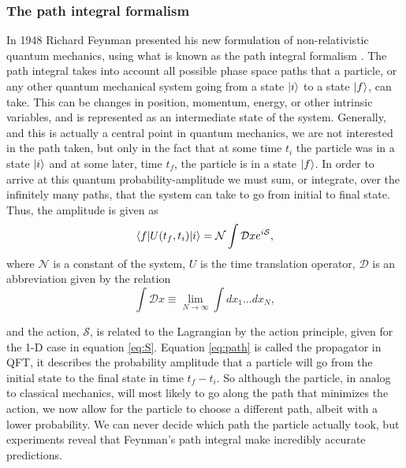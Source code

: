 \subsubsection{The path integral formalism} \label{sec:feynpath}
In 1948 Richard Feynman presented his new formulation of non-relativistic quantum mechanics, using what is known as the path integral formalism \cite{feynman1948sta}. The path integral takes into account all possible phase space paths that a particle, or any other quantum mechanical system going from a state $|i \rangle$ to a state $|f \rangle$, can take. This can be changes in position, momentum, energy, or other intrinsic variables, and is represented as an intermediate state of the system. Generally, and this is actually a central point in quantum mechanics, we are not interested in the path taken, but only in the fact that at some time $t_{i}$ the particle was in a state $|i \rangle$ and at some later, time $t_{f}$, the particle is in a state $|f \rangle$. In order to arrive at this quantum probability-amplitude we must sum, or integrate, over the infinitely many paths, that the system can take to go from initial to final state. Thus, the amplitude is given as \cite{pathinqft}
\begin{equation} \label{eq:path}
	\langle f| U(t_f,t_i) |i \rangle = \mathcal{N} \int \mathcal{D}x e^{i\mathcal{S}},
\end{equation}
where $\mathcal{N}$ is a constant of the system, $U$ is the time translation operator, $\mathcal{D}$ is an abbreviation given by the relation 
\begin{equation}
	\int \mathcal{D} x \equiv \lim_{N \to \infty} \int dx_1 \dots dx_N,
\end{equation}

and the action, $\mathcal{S}$, is related to the Lagrangian by the action principle, given for the 1-D case in equation \ref{eq:S}. Equation \eqref{eq:path} is called the propagator in QFT, it describes the probability amplitude that a particle will go from the initial state to the final state in time $t_f - t_i$. So although the particle, in analog to classical mechanics, will most likely to go along the path that minimizes the action, we now allow for the particle to choose a different path, albeit with a lower probability. We can never decide which path the particle actually took, but experiments reveal that Feynman's path integral make incredibly accurate predictions.

